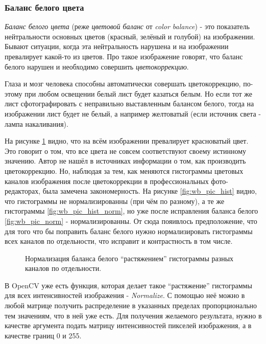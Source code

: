 \documentclass[12pt]{report}
\begin{document}
\subsubsection{Баланс белого цвета}

\emph{Баланс белого цвета} (реже \emph{цветовой баланс} от \textit{color balance}) - это показатель нейтральности 
основных цветов (красный, зелёный и голубой) на изображении. Бывают ситуации, когда эта нейтральность нарушена и на 
изображении превалирует какой-то из цветов. Про такое изображение говорят, что баланс белого нарушен и необходимо 
совершить \emph{цветокоррекцию}. 

Глаза и мозг человека способны автоматически совершать цветокоррекцию, по-этому при любом освещении белый лист будет 
казаться белым. Но если тот же лист сфотографировать с неправильно выставленным балансом белого, тогда на 
изображении 
лист будет не белый, а например желтоватый (если источник света - лампа накаливания).

На рисунке \ref{fig:wb_norm} видно, что на всём изображении превалирует красноватый цвет. Это говорит о том, что все 
цвета не совсем соответствуют своему истинному значению. Автор не нашёл  в источниках информации о том, как 
производить цветокоррекцию. Но, наблюдая за тем, как меняются гистограммы цветовых каналов изображения после 
цветокоррекции в профессиональных фото-редакторах, была замечена закономерность. На рисунке \ref{fig:wb_pic_hist} 
видно, что гистограммы не нормализированны (при чём по разному), а те же гистограммы \ref{fig:wb_pic_hist_norm}, но 
уже после исправления баланса белого \ref{fig:wb_pic_norm} - нормализированны. От сюда пояивлось предположение, что 
для 
того что бы поправить баланс белого нужно нормализировать гистограммы всех каналов по отдельности, что исправит и 
контрастность в том числе.

\begin{figure}[h]
	\centering
		
	\caption{Нормализация баланса белого ``растяжением'' гистограммы разных каналов по отдельности.}
	\label{fig:wb_norm}
\end{figure}

В OpenCV уже есть функция, которая делает такое ``растяжение'' гистограммы для всех интенсивностей изображения - 
\textit{Normalize}. С помощью неё можно в любой матрице получить распределение в указанных пределах пропорционально 
тем значениям, что в ней уже есть. Для получения желаемого результата, нужно в качестве аргумента подать матрицу 
интенсивностей пикселей изображения, а в качестве границ 0 и 255.
\end{document}

